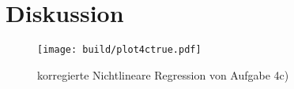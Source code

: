   


\section{Diskussion}


  \begin{figure}[H]
    \texttt{[image: build/plot4ctrue.pdf]}
    \centering
    \caption{korregierte Nichtlineare Regression von Aufgabe 4c)}
    \label{fig:4ctrue}
  \end{figure}

\newpage
\nocite{V353}
\printbibliography
